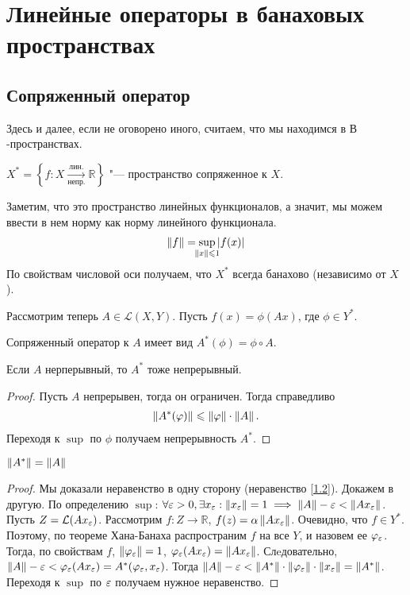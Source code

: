 \section{Линейные операторы в банаховых пространствах}
\subsection{Сопряженный оператор}

Здесь и далее, если не оговорено иного, считаем, что мы находимся в $В$-пространствах.

\begin{definition}
	$X^* = \left\{ f : X \xrightarrow[\text{непр.}]{\text{лин.}} \mathbb{R} \right\}$ "--- пространство сопряженное к $X$.
\end{definition}
Заметим, что это пространство линейных функционалов, а значит, мы можем ввести в нем норму как норму линейного функционала.
\begin{gather}
    \norm{f} = \sup_{\mathclap{\norm{x} \leqslant 1}} \abs{f(x)}  \\
\end{gather}
По свойствам числовой оси получаем, что $X^*$ всегда банахово (независимо от $X$).

Рассмотрим теперь $A \in \mathcal{L}(X, Y)$. Пусть $f(x) = \phi(Ax)$, где $\phi \in Y^*$.
\begin{definition}
	Сопряженный оператор к $A$ имеет вид $A^*(\phi) = \phi \circ A$.
\end{definition}
\begin{statement}
	Если $A$ нерперывный, то $A^*$ тоже непрерывный.
\end{statement}
\begin{proof}
	Пусть $A$ непрерывен, тогда он ограничен. Тогда справедливо
	\begin{gather}
        \left\|A^*(\varphi)\right\| \leqslant \left\|\varphi\right\| \cdot \left\|A\right\|\text{.} \label{1.2}
	\end{gather}
	Переходя к $\sup$ по $\phi$ получаем непрерывность $A^*$.
\end{proof}
\begin{theorem} \label{th1.2}
	$\left\|A^*\right\| = \left\|A\right\|$
\end{theorem}
\begin{proof}
	Мы доказали неравенство в одну сторону (неравенство \ref{1.2}). Докажем в другую.
	По определению $\sup$: $\forall \varepsilon > 0, \exists x_{\varepsilon} : \left\|x_{\varepsilon}\right\| = 1 \implies \left\|A\right\| - \varepsilon < \left\|Ax_{\varepsilon}\right\|$.
	Пусть $Z = \mathcal{L}(Ax_{\varepsilon})$. Рассмотрим $f : Z \rightarrow \mathbb{R}$, $f(z) = \alpha\left\|Ax_{\varepsilon}\right\|$.
    Очевидно, что $f \in Y^*$.
	Поэтому, по теореме Хана-Банаха распространим $f$ на все $Y$, и назовем ее $\varphi_{\varepsilon}$.
	Тогда, по свойствам $f$, $\left\|\varphi_{\varepsilon}\right\| = 1$, $\varphi_{\varepsilon}(Ax_{\varepsilon}) = \left\|Ax_{\varepsilon}\right\|$.
	Слeдовательно, $\left\|A\right\| - \varepsilon < \varphi_{\varepsilon}(Ax_{\varepsilon}) = A^*(\varphi_{\varepsilon}, x_{\varepsilon})$.
	Тогда $\left\|A\right\| - \varepsilon < \left\|A^*\right\| \cdot \left\|\varphi_{\varepsilon}\right\| \cdot \left\|x_{\varepsilon}\right\| = \left\|A^*\right\|$.
	Переходя к $\sup$ по $\varepsilon$ получаем нужное неравенство.
\end{proof}

